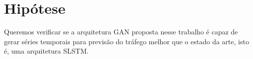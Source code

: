 
\section{Hipótese}

Queremos verificar se a arquitetura \acrshort{GAN} proposta nesse trabalho é capaz de gerar séries temporais para previsão do tráfego melhor que o estado da arte, isto é, uma arquitetura \acrshort{SLSTM}.